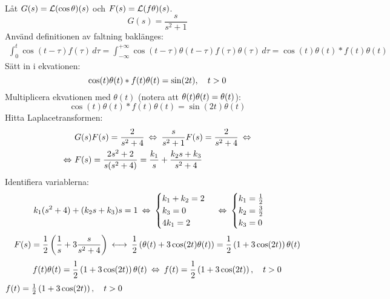 \begin{task}{6.10}
	Låt $G(s)=\operatorname{\mathcal{L}}(\cos\theta)(s)$ och $F(s)=\operatorname{\mathcal{L}}(f\theta)(s)$.
	\[G(s)=\frac{s}{s^2+1}\]
	Använd definitionen av faltning baklänges:
	\begin{align*}
	\int_{0}^{t}\!\cos(t-\tau)f(\tau)\, d\tau=
	\int_{-\infty}^{+\infty}\!\cos(t-\tau)\theta(t-\tau)f(\tau)\theta(\tau)\, d\tau=
	\cos(t)\theta(t)*f(t)\theta(t)
	\end{align*}
	Sätt in i ekvationen:
	\[\cos(t)\theta(t)*f(t)\theta(t)=\sin(2t), \quad t>0\]
	Multiplicera ekvationen med $\theta(t)$ (notera att $\theta(t)\*\theta(t)=\theta(t)$):
	\[\cos(t)\theta(t)*f(t)\theta(t)=\sin(2t)\theta(t)\]
	Hitta Laplacetransformen:
	\begin{align*}
	&G(s)F(s)=\frac{2}{s^2+4} \lra
	\frac{s}{s^2+1}F(s)=\frac{2}{s^2+4} \lra \\ \lra
	&F(s)=
	\frac{2s^2+2}{s(s^2+4)}=
	\frac{k_1}{s}+\frac{k_2s+k_3}{s^2+4}
	\end{align*}
	Identifiera variablerna:
	\begin{align*}
	&k_1(s^2+4)+(k_2s+k_3)s=1 \lra
	\begin{cases}
	k_1+k_2=2 \\
	k_3=0 \\
	4k_1=2
	\end{cases} \lra
	\begin{cases}
	k_1=\frac{1}{2} \\
	k_2=\frac{3}{2} \\
	k_3=0
	\end{cases}
	\end{align*}
	\begin{align*}
	F(s)=
	\frac{1}{2}\left(\frac{1}{s}+3\frac{s}{s^2+4}\right) \llra
	\frac{1}{2}\left(\theta(t)+3\cos(2t)\theta(t)\right)=
	\frac{1}{2}\left(1+3\cos(2t)\right)\theta(t)
	\end{align*}
	\[f(t)\theta(t)=\frac{1}{2}\left(1+3\cos(2t)\right)\theta(t)\lra
	f(t)=\frac{1}{2}\left(1+3\cos(2t)\right)\cond{t>0}\]
	\ans $f(t)=\frac{1}{2}\left(1+3\cos(2t)\right), \quad t>0$
\end{task}